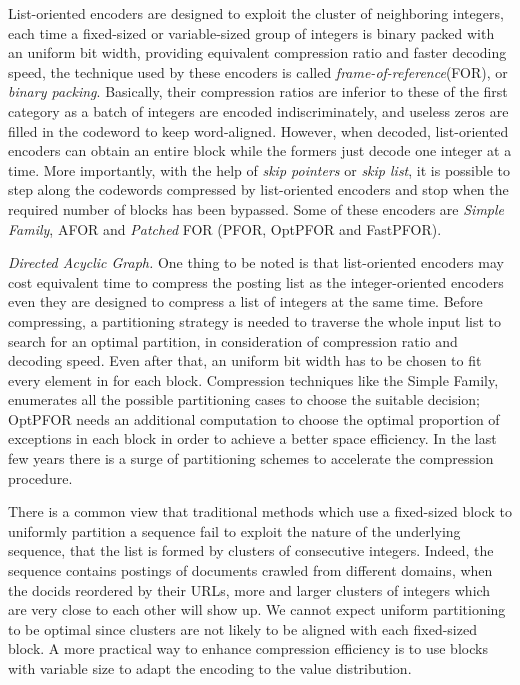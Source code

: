 \documentclass[runningheads,a4paper]{llncs}
\begin{document}
List-oriented encoders are designed to exploit the cluster of neighboring integers, each time a fixed-sized or variable-sized group of integers is binary packed with an uniform bit width, providing equivalent compression ratio and faster decoding speed, the technique used by these encoders is called \textit{frame-of-reference}(FOR), or \textit{binary packing}\cite{goldstein1998compressing}.
Basically, their compression ratios are inferior to these of the first category as a batch of integers are encoded indiscriminately, and useless zeros are filled in the codeword to keep word-aligned.
However, when decoded, list-oriented encoders can obtain an entire block while the formers just decode one integer at a time.
More importantly, with the help of \textit{skip pointers} or \textit{skip list}, it is possible to step along the codewords compressed by list-oriented encoders and stop when the required number of blocks has been bypassed.
Some of these encoders are \textit{Simple Family}, AFOR and \textit{Patched} FOR (PFOR, OptPFOR and FastPFOR).

\textit{Directed Acyclic Graph.}
One thing to be noted is that list-oriented encoders may cost equivalent time to compress the posting list as the integer-oriented encoders even they are designed to compress a list of integers at the same time.
Before compressing, a partitioning strategy is needed to traverse the whole input list to search for an optimal partition, in consideration of compression ratio and decoding speed.
Even after that, an uniform bit width has to be chosen to fit every element in for each block.
Compression techniques like the Simple Family\cite{anh2005inverted,anh2010index}, enumerates all the possible partitioning cases to choose the suitable decision; OptPFOR\cite{yan2009inverted} needs an additional computation to choose the optimal proportion of exceptions in each block in order to achieve a better space efficiency.
In the last few years there is a surge of partitioning schemes to accelerate the compression procedure\cite{lemire2015decoding,ottaviano2014partitioned}.

There is a common view that traditional methods which use a fixed-sized block to uniformly partition a sequence fail to exploit the nature of the underlying sequence, that the list is formed by clusters of consecutive integers.
Indeed, the sequence contains postings of documents crawled from different domains, when the docids reordered by their URLs, more and larger clusters of integers which are very close to each other will show up.
We cannot expect uniform partitioning to be optimal since clusters are not likely to be aligned with each fixed-sized block.
A more practical way to enhance compression efficiency is to use blocks with variable size to adapt the encoding to the value distribution.
\end{document}
